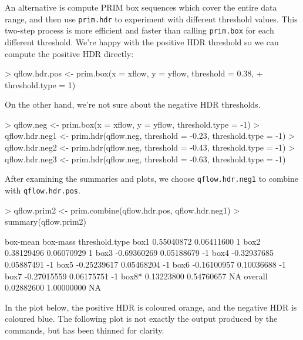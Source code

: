 \documentclass[a4paper,11pt]{article}
\begin{document}
An alternative is compute PRIM box sequences which cover the entire data range, 
and then use \texttt{prim.hdr} to experiment with different threshold values.
This two-step process is more efficient and faster than calling \texttt{prim.box}
for each different threshold.
We're happy with the positive HDR threshold so we can compute the positive
HDR directly: 
\begin{Schunk}
\begin{Sinput}
> qflow.hdr.pos <- prim.box(x = xflow, y = yflow, threshold = 0.38, 
+     threshold.type = 1)
\end{Sinput}
\end{Schunk}
On the other hand, we're not sure about the negative HDR thresholds.
\begin{Schunk}
\begin{Sinput}
> qflow.neg <- prim.box(x = xflow, y = yflow, threshold.type = -1)
> qflow.hdr.neg1 <- prim.hdr(qflow.neg, threshold = -0.23, threshold.type = -1)
> qflow.hdr.neg2 <- prim.hdr(qflow.neg, threshold = -0.43, threshold.type = -1)
> qflow.hdr.neg3 <- prim.hdr(qflow.neg, threshold = -0.63, threshold.type = -1)
\end{Sinput}
\end{Schunk}
After examining the summaries and plots, we  
choose \texttt{qflow.hdr.neg1} to combine with \texttt{qflow.hdr.pos}.
\begin{Schunk}
\begin{Sinput}
> qflow.prim2 <- prim.combine(qflow.hdr.pos, qflow.hdr.neg1)
> summary(qflow.prim2)
\end{Sinput}
\begin{Soutput}
           box-mean   box-mass threshold.type
box1     0.55040872 0.06411600              1
box2     0.38129496 0.06070929              1
box3    -0.69360269 0.05188679             -1
box4    -0.32937685 0.05887491             -1
box5    -0.25239617 0.05468204             -1
box6    -0.16100957 0.10036688             -1
box7    -0.27015559 0.06175751             -1
box8*    0.13223800 0.54760657             NA
overall  0.02882600 1.00000000             NA
\end{Soutput}
\end{Schunk}
In the plot below, the positive HDR is coloured orange, and the 
negative HDR is coloured blue.  
The following plot is not exactly the output produced by the commands,
but has been thinned for clarity.
\begin{Schunk}
\end{Schunk}
 
\end{document}
